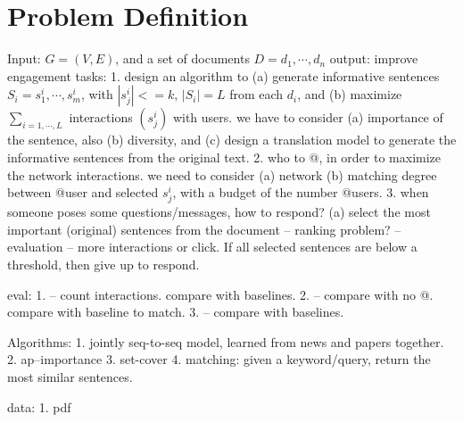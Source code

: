 \section{Problem Definition}
Input: $G=(V, E)$, and a set of documents $D={d_1, \cdots, d_n}$
output: improve engagement
tasks:
    1. design an algorithm to (a) generate informative sentences $S_i={s_1^i, \cdots, s_m^i}$, with $|s_{j}^i|<=k$, $|S_i|=L$ from each $d_i$, and (b) maximize $\sum_{i=1, \cdots, L}$ interactions $(s_j^i)$ with users.   we have to consider (a) importance of the sentence, also (b) diversity, and (c) design a translation model to generate the informative sentences from the original text.
    2. who to @, in order to maximize the network interactions. we need to consider (a) network (b) matching degree between @user and selected $s_j^i$, with a budget of the number @users.
   3. when someone poses some questions/messages, how to respond? (a) select the most important (original) sentences from the document -- ranking problem? -- evaluation -- more interactions or click. If all selected sentences  are below a threshold, then give up to respond.

eval:
  1. -- count interactions. compare with baselines.
  2. -- compare with no @. compare with baseline to match.
  3. -- compare with baselines.

Algorithms:
  1. jointly seq-to-seq model, learned from news and papers together.
  2. ap--importance
  3. set-cover
  4. matching: given a keyword/query, return the most similar sentences.

data: 
  1. pdf